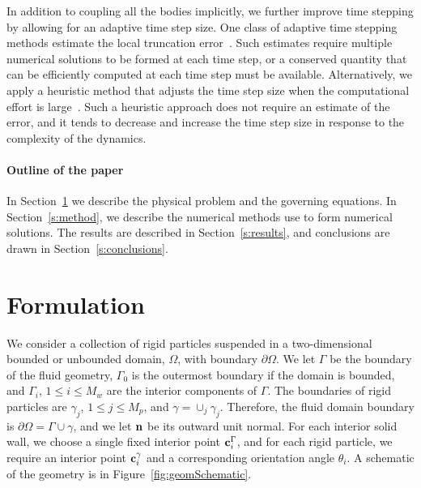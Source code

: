 \documentclass[AMA,STIX1COL]{WileyNJD-v2}
\begin{document}
In addition to coupling all the bodies implicitly, we further improve
time stepping by allowing for an adaptive time step size. One class of
adaptive time stepping methods estimate the local truncation
error~\cite{Quaife2015, Quaife2015a, Sorgentone2018}.  Such estimates
require multiple numerical solutions to be formed at each time step, or
a conserved quantity that can be efficiently computed at each time step
must be available.  Alternatively, we apply a heuristic method that
adjusts the time step size when the computational effort is
large~\cite{Kropinski1999}.  Such a heuristic approach does not require
an estimate of the error, and it tends to decrease and increase the time
step size in response to the complexity of the dynamics.

\paragraph{Outline of the paper}
In Section~\ref{s:formulation} we describe the physical problem and the
governing equations.  In Section~\ref{s:method}, we describe the
numerical methods use to form numerical solutions.  The results are
described in Section~\ref{s:results}, and conclusions are drawn in
Section~\ref{s:conclusions}.

\section{Formulation}\label{s:formulation} 
We consider a collection of rigid particles suspended in a
two-dimensional bounded or unbounded domain, $\Omega$, with boundary
$\partial\Omega$. We let $\Gamma$ be the boundary of the fluid geometry,
$\Gamma_0$ is the outermost boundary if the domain is bounded, and
$\Gamma_i$, $1\leq i \leq M_w$ are the interior components of $\Gamma$.
The boundaries of rigid particles are $\gamma_j$, $1\leq j\leq M_p$, and
$\gamma = \cup_{j} \gamma_j$. Therefore, the fluid domain boundary is
$\partial\Omega =\Gamma \cup \gamma$, and we let ${\mathbf{n}}$ be its outward
unit normal.  For each interior solid wall, we choose a single fixed
interior point ${\mathbf{c}}^\Gamma_i$, and for each rigid particle, we require
an interior point ${\mathbf{c}}^\gamma_i$ and a corresponding orientation angle
$\theta_i$.  A schematic of the geometry is in
Figure~\ref{fig:geomSchematic}.
\end{document}
